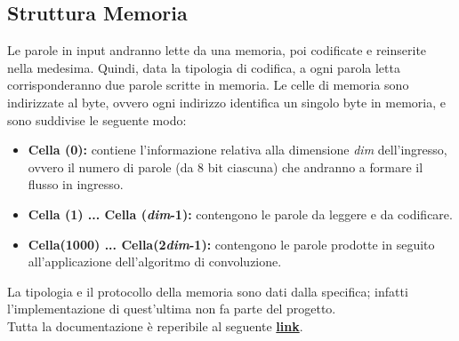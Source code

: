 \documentclass[a4paper]{article}
\begin{document}
\subsection{Struttura Memoria}
Le parole in input andranno lette da una memoria, poi codificate e reinserite nella medesima. Quindi, data la tipologia di codifica, a ogni parola letta corrisponderanno due parole scritte in memoria.
Le celle di memoria sono indirizzate al byte, ovvero ogni indirizzo identifica un singolo byte in memoria, e sono suddivise le seguente modo:
\begin{itemize}
    \item\textbf{Cella (0):} contiene l'informazione relativa alla dimensione \textit{dim} dell'ingresso, ovvero il numero di parole (da 8 bit ciascuna) che andranno a formare il flusso in ingresso.
    \item \textbf{Cella (1) ... Cella (\textit{dim}-1):} contengono le parole da leggere e da codificare.
    \item \textbf{Cella(1000) ... Cella({2}\textit{dim}-1):} contengono le parole prodotte in seguito all'applicazione dell'algoritmo di convoluzione.

\end{itemize}   
    La tipologia e il protocollo della memoria sono dati dalla specifica; infatti l'implementazione di quest'ultima non fa parte del progetto.\\ 
    Tutta la documentazione è reperibile al seguente \textbf{\textcolor{blue}{\href{https://docs.xilinx.com/v/u/2017.3-English/ug901-vivado-synthesis}{link}}}.
\end{document}
